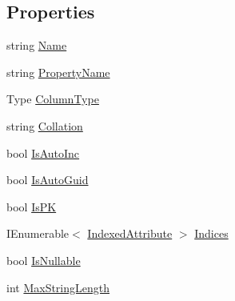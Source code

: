 \subsection*{Properties}
\begin{DoxyCompactItemize}
\item 
string \hyperlink{class_s_q_lite_1_1_table_mapping_1_1_column_a95c3ae2c8502cb3074751fbfee766bb0}{Name}
\item 
string \hyperlink{class_s_q_lite_1_1_table_mapping_1_1_column_af4b9a6b1eddbba6a9ec9dc2f9a8b6820}{Property\+Name}
\item 
Type \hyperlink{class_s_q_lite_1_1_table_mapping_1_1_column_afb3b922b5b0eb59eb826bb26b9838d61}{Column\+Type}
\item 
string \hyperlink{class_s_q_lite_1_1_table_mapping_1_1_column_a6d8ba39bedd7336a17c5271479c7bb5a}{Collation}
\item 
bool \hyperlink{class_s_q_lite_1_1_table_mapping_1_1_column_a8cdcb1406f9ef7472b829f34c1f96360}{Is\+Auto\+Inc}
\item 
bool \hyperlink{class_s_q_lite_1_1_table_mapping_1_1_column_a5775c9a99e9b3ee8dd8f34b162b1e4ab}{Is\+Auto\+Guid}
\item 
bool \hyperlink{class_s_q_lite_1_1_table_mapping_1_1_column_a74b6f353e1632310fa12414e36407c50}{Is\+P\+K}
\item 
I\+Enumerable$<$ \hyperlink{class_s_q_lite_1_1_indexed_attribute}{Indexed\+Attribute} $>$ \hyperlink{class_s_q_lite_1_1_table_mapping_1_1_column_a5153b02c01f808c46d83f1bccc23aa40}{Indices}
\item 
bool \hyperlink{class_s_q_lite_1_1_table_mapping_1_1_column_a2ff8d12dcf449ca9407c4c3222521c96}{Is\+Nullable}
\item 
int \hyperlink{class_s_q_lite_1_1_table_mapping_1_1_column_a762d97a3a799c0f7a31b034eb0f3db71}{Max\+String\+Length}
\end{DoxyCompactItemize}



